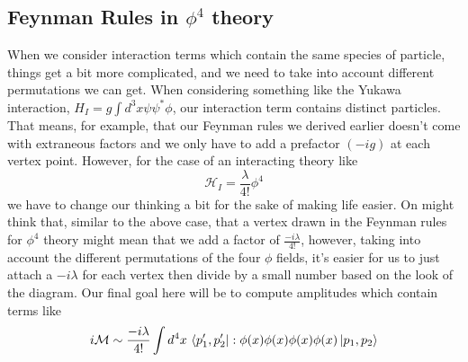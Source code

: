 \subsection{Feynman Rules in $\phi ^ 4 $ theory} 

When we consider interaction terms which contain 
the same species of particle, things get a bit more complicated, 
and we need to take into account different permutations we can get. 
When considering something like the 
Yukawa interaction, $ H _ I =  g \int d^ 3 x \psi \psi ^ * \phi $, 
our interaction term contains distinct particles. That means, for example, 
that our Feynman rules we derived earlier doesn't come 
with extraneous factors and we only have to add a prefactor $ ( - ig ) $
at each vertex point. 
However, for the case of an interacting theory like 
 \[
 \mathcal{ H } _ I = \frac{\lambda }{ 4 ! } \phi ^ 4  
\] we have to change our thinking a bit for the sake of making life 
easier. On might think that, similar to the above case, 
that a vertex drawn in the Feynman rules for $ \phi ^ 4 $ theory 
might mean that we add a factor of $ \frac{ - i \lambda }{ 4 ! } $, 
however, taking into account the different permutations
of the four $ \phi $ fields, it's easier for us to just 
attach a $  - i \lambda $ for each vertex then divide by a small number 
based on the look of the diagram. 
Our final goal here will be to compute amplitudes which contain 
terms like 
\[
 i \mathcal{ M } \sim \frac{ - i \lambda}{ 4 ! } \int d^ 4 x \, 
 \bra{ p_1 ' , p_2 ' } : \phi ( x) \phi ( x) \phi ( x) \phi ( x) \ket{ p_1 , p_2 } 
\]

